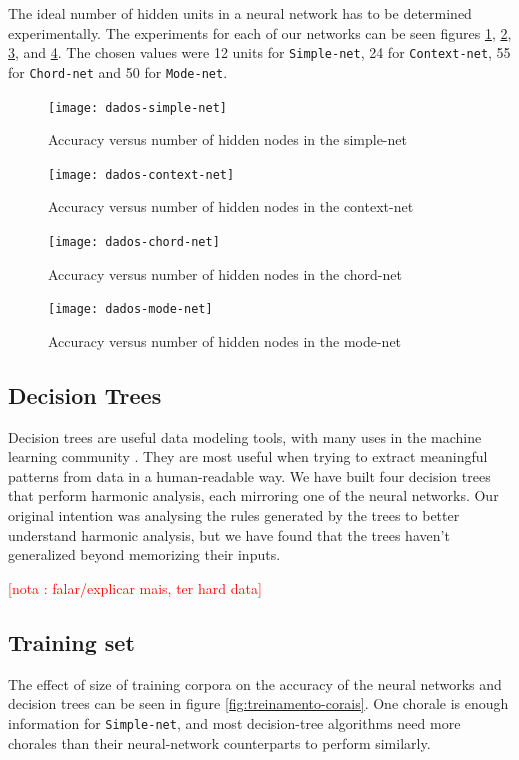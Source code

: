 \documentclass{article}
\newcounter{notacounter}
\newcommand{\nota}[1]{
  \addtocounter{notacounter}{1}
  \textcolor{red}{[nota \arabic{notacounter}: #1]}
}
\begin{document}
The ideal number of hidden units in a neural network has to be
determined experimentally. The experiments for each of our networks
can be seen figures \ref{fig:simple-net}, \ref{fig:context-net},
\ref{fig:chord-net}, and \ref{fig:mode-net}. The chosen values were 12
units for \texttt{Simple-net}, 24 for \texttt{Context-net}, 55 for
\texttt{Chord-net} and 50 for \texttt{Mode-net}.

\begin{figure}
  \texttt{[image: dados-simple-net]}
  \caption{Accuracy versus number of hidden nodes in the simple-net}
  \label{fig:simple-net}
\end{figure}

\begin{figure}
  \texttt{[image: dados-context-net]}
  \caption{Accuracy versus number of hidden nodes in the context-net}
  \label{fig:context-net}
\end{figure}

\begin{figure}
  \texttt{[image: dados-chord-net]}
  \caption{Accuracy versus number of hidden nodes in the chord-net}
  \label{fig:chord-net}
\end{figure}

\begin{figure}
  \texttt{[image: dados-mode-net]}
  \caption{Accuracy versus number of hidden nodes in the mode-net}
  \label{fig:mode-net}
\end{figure}

\subsection{Decision Trees}

Decision trees are useful data modeling tools, with many uses in the
machine learning community \cite{Mitchell:1997:ML,
  russell02:aima}. They are most useful when trying to extract
meaningful patterns from data in a human-readable way. We have built
four decision trees that perform harmonic analysis, each mirroring one
of the neural networks. Our original intention was analysing the rules
generated by the trees to better understand harmonic analysis, but we
have found that the trees haven't generalized beyond memorizing their
inputs. \nota{falar/explicar mais, ter hard data}

\subsection{Training set}
The effect of size of training corpora on the accuracy of the neural
networks and decision trees can be seen in figure
\ref{fig:treinamento-corais}. One chorale is enough information for
\texttt{Simple-net}, and most decision-tree algorithms need more
chorales than their neural-network counterparts to perform similarly.
\end{document}
